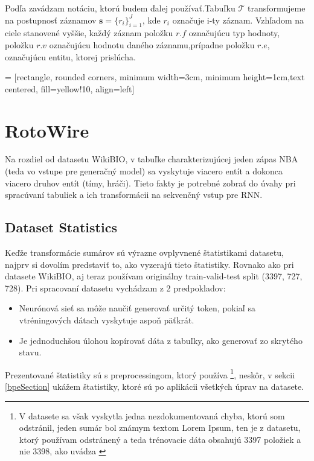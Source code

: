 Podľa \citep{liang-etal-2009-learning} zavádzam notáciu, ktorú budem ďalej používať.\linebreak[4]Tabuľku $\mathcal{T}$ transformujeme na postupnosť záznamov $ \mathbf{s} = \{ r_i \}_{i=1}^{J} $, kde $r_i$ označuje i-ty záznam. Vzhľadom na ciele stanovené vyššie, každý záznam položku $r.f$ označujúcu typ hodnoty, položku $r.v$ označujúcu hodnotu daného záznamu,\linebreak[4]prípadne položku $r.e$, označujúcu entitu, ktorej prislúcha.

 = [rectangle, rounded corners, minimum width=3cm, minimum height=1cm,text centered, fill=yellow!10, align=left]

\section{RotoWire} \label{rotowire_preproc_section}

Na rozdiel od datasetu WikiBIO, v tabuľke charakterizujúcej jeden zápas NBA (teda vo vstupe pre generačný model) sa vyskytuje viacero entít a dokonca viacero druhov entít (tímy, hráči). Tieto fakty je potrebné zobrať do úvahy pri spracúvaní tabuliek a ich transformácii na sekvenčný vstup pre RNN.

\subsection{Dataset Statistics} \label{assumptions_ref}

Keďže transformácie sumárov sú výrazne ovplyvnené štatistikami datasetu, najprv si dovolím predstaviť to, ako vyzerajú tieto štatistiky. Rovnako ako pri datasete WikiBIO, aj teraz používam originálny train-valid-test split (3397, 727, 728). Pri spracovaní datasetu vychádzam z 2 predpokladov:
\begin{itemize}
\item Neurónová sieť sa môže naučiť generovať určitý token, pokiaľ sa v\linebreak[4]tréningových dátach vyskytuje aspoň päťkrát.
\item Je jednoduchšou úlohou kopírovať dáta z tabuľky, ako generovať zo skrytého stavu.
\end{itemize}

Prezentované štatistiky sú s preprocessingom, ktorý používa \citep{wiseman2017} \footnote{V datasete sa však vyskytla jedna nezdokumentovaná chyba, ktorú som odstránil, jeden sumár bol známym textom Lorem Ipsum, ten je z datasetu, ktorý používam odstránený a teda trénovacie dáta obsahujú 3397 položiek a nie 3398, ako uvádza \citep{wiseman2017} \label{footnote_wis_fault_li}}, neskôr, v sekcii \ref{bpeSection} ukážem štatistiky, ktoré sú po aplikácii všetkých úprav na datasete.

